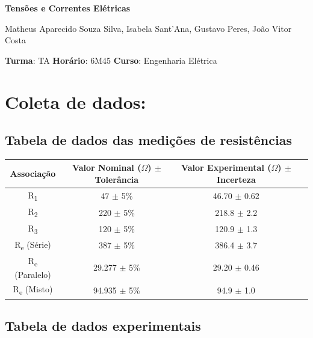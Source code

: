 \documentclass{article}
\begin{document}
\begin{center}
    \huge
    \textbf{Tensões e Correntes Elétricas}
    \normalsize
    \vspace{10pt}

    Matheus Aparecido Souza Silva, Isabela Sant'Ana, Gustavo Peres, João Vitor Costa
    \vspace{5pt}

    \textbf{Turma}: TA \quad \textbf{Horário}: 6M45 \quad \textbf{Curso}: Engenharia Elétrica
\end{center}

\section{Coleta de dados:}

\subsection{Tabela de dados das medições de resistências}

\begin{tabular}{|c|c|c|c|}
    \hline
    Associação & Valor Nominal (\(\Omega\)) $\pm$ Tolerância & Valor Experimental (\(\Omega\)) $\pm$ Incerteza \\
    \hline
    R\textsubscript{1} & 47 $\pm$ 5\% & 46.70 $\pm$ 0.62 \\
    \hline
    R\textsubscript{2} & 220 $\pm$ 5\% & 218.8 $\pm$ 2.2 \\
    \hline
    R\textsubscript{3} & 120 $\pm$ 5\% & 120.9 $\pm$ 1.3 \\
    \hline
    R\textsubscript{e} (Série) & 387 $\pm$ 5\% & 386.4 $\pm$ 3.7 \\
    \hline
    R\textsubscript{e} (Paralelo) & 29.277 $\pm$ 5\% & 29.20 $\pm$ 0.46 \\
    \hline
    R\textsubscript{e} (Misto) & 94.935 $\pm$ 5\% & 94.9 $\pm$ 1.0 \\
    \hline 
\end{tabular}

\subsection{Tabela de dados experimentais}
\end{document}
